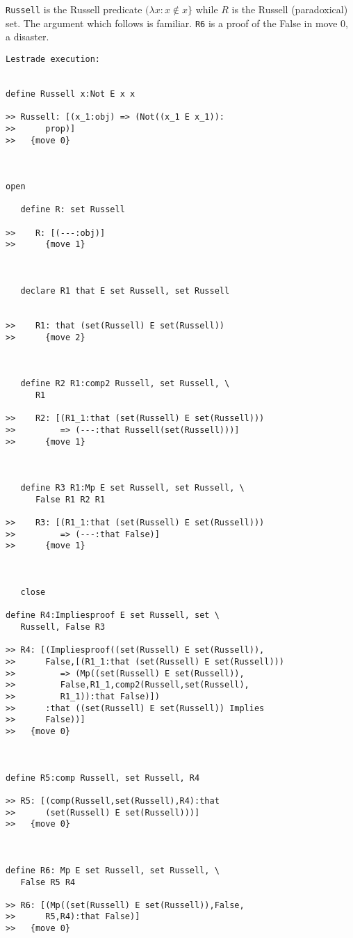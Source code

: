\documentclass[12pt]{article}
\begin{document}
{\tt Russell} is the Russell predicate $(\lambda x:x \not\in x\}$ while $R$ is the Russell (paradoxical) set.  The argument which follows
is familiar.  {\tt R6} is a proof of the False in move 0, a disaster.

\begin{verbatim}Lestrade execution:


define Russell x:Not E x x

>> Russell: [(x_1:obj) => (Not((x_1 E x_1)):
>>      prop)]
>>   {move 0}



open

   define R: set Russell

>>    R: [(---:obj)]
>>      {move 1}



   declare R1 that E set Russell, set Russell


>>    R1: that (set(Russell) E set(Russell))
>>      {move 2}



   define R2 R1:comp2 Russell, set Russell, \
      R1

>>    R2: [(R1_1:that (set(Russell) E set(Russell)))
>>         => (---:that Russell(set(Russell)))]
>>      {move 1}



   define R3 R1:Mp E set Russell, set Russell, \
      False R1 R2 R1

>>    R3: [(R1_1:that (set(Russell) E set(Russell)))
>>         => (---:that False)]
>>      {move 1}



   close

define R4:Impliesproof E set Russell, set \
   Russell, False R3

>> R4: [(Impliesproof((set(Russell) E set(Russell)),
>>      False,[(R1_1:that (set(Russell) E set(Russell)))
>>         => (Mp((set(Russell) E set(Russell)),
>>         False,R1_1,comp2(Russell,set(Russell),
>>         R1_1)):that False)])
>>      :that ((set(Russell) E set(Russell)) Implies
>>      False))]
>>   {move 0}



define R5:comp Russell, set Russell, R4

>> R5: [(comp(Russell,set(Russell),R4):that
>>      (set(Russell) E set(Russell)))]
>>   {move 0}



define R6: Mp E set Russell, set Russell, \
   False R5 R4

>> R6: [(Mp((set(Russell) E set(Russell)),False,
>>      R5,R4):that False)]
>>   {move 0}


\end{verbatim}
\end{document}
